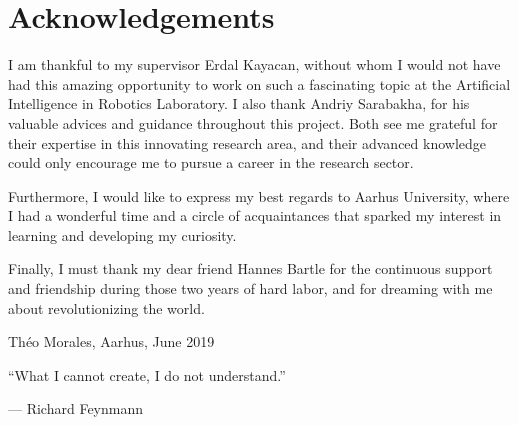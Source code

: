 \thispagestyle{plain}			%
\section*{Acknowledgements}

I am thankful to my supervisor Erdal Kayacan, without whom I would not have had
this amazing opportunity to work on such a fascinating topic at the Artificial
Intelligence in Robotics Laboratory. I also thank Andriy Sarabakha, for his
valuable advices and guidance throughout this project. Both see me grateful for
their expertise in this innovating research area, and their advanced knowledge
could only encourage me to pursue a career in the research sector.

Furthermore, I would like to express my best regards to Aarhus University,
where I had a wonderful time and a circle of acquaintances that sparked my
interest in learning and developing my curiosity.

Finally, I must thank my dear friend Hannes Bartle for the continuous support
and friendship during those two years of hard labor, and for dreaming with me
about revolutionizing the world. 

\vspace{1.5cm}
\hfill
Théo Morales, Aarhus, June 2019




\newpage				%
\vspace{8cm}
\epigraph{``What I cannot create, I do not understand.''}{--- \textup{Richard Feynmann}}
